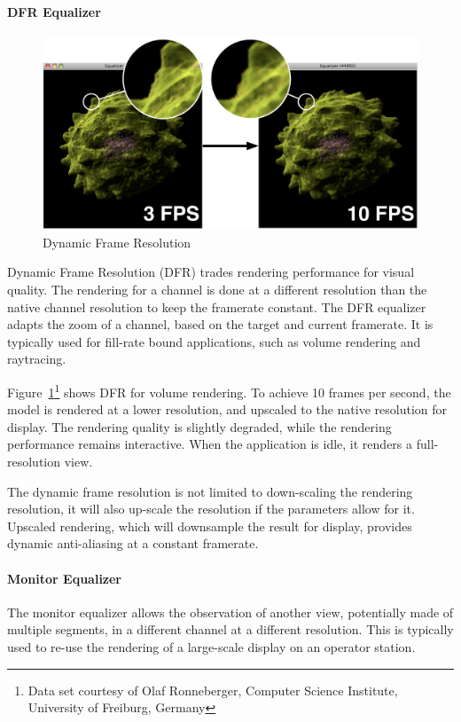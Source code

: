 \documentclass[10pt,a4]{scrartcl}
\newcommand{\fig}[1]{Figure~\ref{#1}}
\begin{document}
\paragraph{DFR Equalizer}
\begin{figure}
  \includegraphics[width=.618\textwidth]{images/dfr.pdf}
  {\caption{\label{fDFR}\small Dynamic Frame Resolution}}
\end{figure}
Dynamic Frame Resolution (DFR) trades rendering performance for visual
quality. The rendering for a channel is done at a different resolution
than the native channel resolution to keep the framerate constant. The
DFR equalizer adapts the zoom of a channel, based on the target and
current framerate. It is typically used for fill-rate bound
applications, such as volume rendering and raytracing.

\fig{fDFR}\footnote{Data set courtesy of Olaf Ronneberger, Computer
  Science Institute, University of Freiburg, Germany} shows DFR for
volume rendering. To achieve 10 frames per second, the model is rendered
at a lower resolution, and upscaled to the native resolution for
display. The rendering quality is slightly degraded, while the rendering
performance remains interactive. When the application is idle, it
renders a full-resolution view.

The dynamic frame resolution is not limited to down-scaling the
rendering resolution, it will also up-scale the resolution if the
parameters allow for it. Upscaled rendering, which will downsample the
result for display, provides dynamic anti-aliasing at a constant
framerate.

\paragraph{Monitor Equalizer}
The monitor equalizer allows the observation of another view,
potentially made of multiple segments, in a different channel at a
different resolution. This is typically used to re-use the rendering of
a large-scale display on an operator station.
\end{document}
